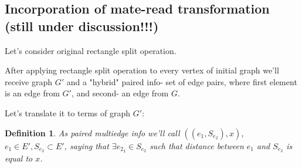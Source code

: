 \documentclass[12pt,a4paper,oneside]{article}
\newtheorem{definition}{Definition}
\begin{document}






\subsection{Incorporation of mate-read transformation (still under discussion!!!)}
Let's consider original rectangle split operation. 

After applying rectangle split operation to every vertex of initial graph we'll receive
graph $G'$ and a "hybrid" paired info- set of edge pairs, where first
element is an edge from $G'$, and second- an edge from $G$.

Let's translate it to terms of graph $G'$:
\begin{definition}
As \emph{paired multiedge info}
we'll call $((e_1, S_{e_2}), x)$, $e_1\in E',
S_{e_2}\subset E'$, saying that $\exists {e_2}_i \in S_{e_2}$ such that
distance between $e_1$ and $S_{e_2}$ is equal to $x$.
\end{definition}
\end{document}
